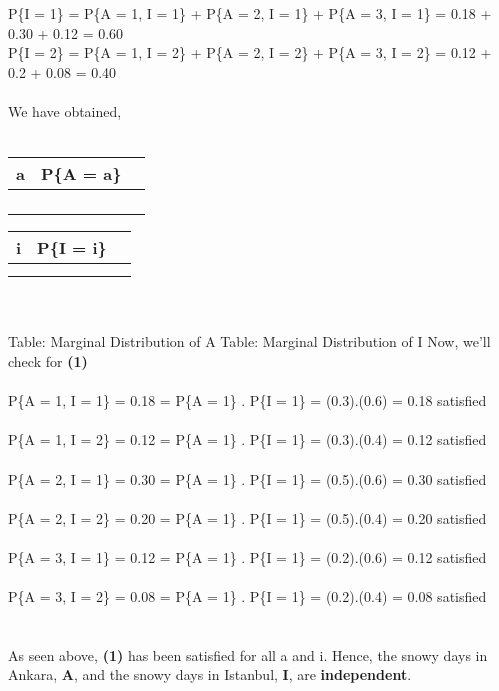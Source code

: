 \documentclass[11pt]{article}
\begin{document}
\noindent P\{I = 1\} = P\{A = 1, I = 1\} + P\{A = 2, I = 1\} + P\{A = 3, I = 1\}  = 0.18 + 0.30 + 0.12 = 0.60 \\
\noindent P\{I = 2\} = P\{A = 1, I = 2\} + P\{A = 2, I = 2\} + P\{A = 3, I = 2\}  = 0.12 + 0.2 + 0.08 = 0.40 \\ \\
We have obtained, \\ \\
\begin{tabularx}{0.4\textwidth}{ 
  | >{\raggedright\arraybackslash}X 
  | >{\centering\arraybackslash}X 
  | >{\raggedleft\arraybackslash}X | }
 \hline
  \textbf{a} & \textbf{P\{A = a\}}\\
 \hline
 1  & 0.3\\
  \hline
 2  & 0.5\\
  \hline
 3  & 0.2\\
\hline \space \space \space
\end{tabularx} \space \space \space \space 
\begin{tabularx}{0.4\textwidth} { 
  | >{\raggedright\arraybackslash}X 
  | >{\centering\arraybackslash}X 
  | >{\raggedleft\arraybackslash}X | }
 \hline
  \textbf{i} & \textbf{P\{I = i\}}\\
 \hline
 1  & 0.6\\
  \hline
 2  & 0.4\\
\hline
\end{tabularx} \\ \\
Table: Marginal Distribution of A \space \space \space \space \space \space \space \space \space \space \space \space \space \space Table: Marginal Distribution of I
\newpage \noindent
Now, we'll check for \textbf{(1)} \\ \\
P\{A = 1, I = 1\} = 0.18 = P\{A = 1\} . P\{I = 1\} = (0.3).(0.6) = 0.18 \longrightarrow \space \space satisfied\\ \\
P\{A = 1, I = 2\} = 0.12 = P\{A = 1\} . P\{I = 1\} = (0.3).(0.4) = 0.12 \longrightarrow \space \space satisfied\\ \\
P\{A = 2, I = 1\} = 0.30 = P\{A = 1\} . P\{I = 1\} = (0.5).(0.6) = 0.30 \longrightarrow \space \space satisfied\\ \\
P\{A = 2, I = 2\} = 0.20 = P\{A = 1\} . P\{I = 1\} = (0.5).(0.4) = 0.20 \longrightarrow \space \space satisfied\\ \\
P\{A = 3, I = 1\} = 0.12 = P\{A = 1\} . P\{I = 1\} = (0.2).(0.6) = 0.12 \longrightarrow \space \space satisfied\\ \\
P\{A = 3, I = 2\} = 0.08 = P\{A = 1\} . P\{I = 1\} = (0.2).(0.4) = 0.08 \longrightarrow \space \space satisfied\\ \\ \\

\noindent As seen above, \textbf{(1)} has been satisfied for all a and i. Hence, the snowy days in Ankara, \textbf{A}, and the snowy days in Istanbul, \textbf{I}, are \textbf{independent}.
\end{document}
